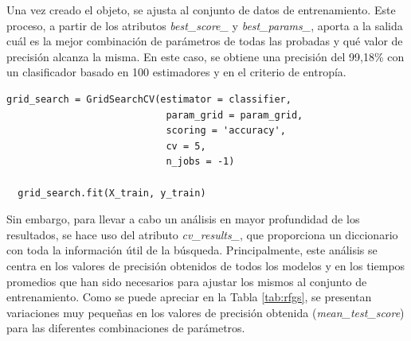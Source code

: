 \vspace{3mm}

Una vez creado el objeto, se ajusta al conjunto de datos de entrenamiento. Este proceso, a partir de los atributos \textit{best\_score\_} y \textit{best\_params\_}, aporta a la salida cuál es la mejor combinación de parámetros de todas las probadas y qué valor de precisión alcanza la misma. En este caso, se obtiene una precisión del 99,18\% con un clasificador basado en 100 estimadores y en el criterio de entropía. 

\vspace{3mm}

\begin{lstlisting}[style=Python, caption={Construcción del objeto \textit{GridSearchCV()}}]
  grid_search = GridSearchCV(estimator = classifier,
                            param_grid = param_grid,
                            scoring = 'accuracy',
                            cv = 5,
                            n_jobs = -1)

  grid_search.fit(X_train, y_train)
\end{lstlisting}

\vspace{3mm}

Sin embargo, para llevar a cabo un análisis en mayor profundidad de los resultados, se hace uso del atributo \textit{cv\_results\_}, que proporciona un diccionario con toda la información útil de la búsqueda. Principalmente, este análisis se centra en los valores de precisión obtenidos de todos los modelos y en los tiempos promedios que han sido necesarios para ajustar los mismos al conjunto de entrenamiento. Como se puede apreciar en la Tabla \ref{tab:rfgs}, se presentan variaciones muy pequeñas en los valores de precisión obtenida (\textit{mean\_test\_score}) para las diferentes combinaciones de parámetros.

\vspace{3mm}

